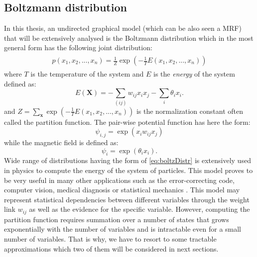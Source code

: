 \documentclass[../report/report.tex]{subfiles}
\begin{document}
\subsection{Boltzmann distribution}
In this thesis, an undirected graphical model (which can be also seen a MRF) that will be extensively analysed is the Boltzmann distribution which in the most general form has the following joint distribution:
\begin{align}
\begin{split}
p(x_1,x_2, ..., x_n) = \frac{1}{Z}\exp \left(-\frac{1}{T}E(x_1,x_2, ..., x_n) \right)
\end{split}
\label{eq:boltzDistr}
\end{align}
where $T$ is the temperature of the system and  $E$ is the \emph{energy} of the system defined as:
$$E(\mathbf{X}) = -\sum_{(ij)} w_{ij} x_i x_j -\sum_i  \theta_i x_i.$$
and $Z = \sum_{\mathbf{x}}\exp (-\frac{1}{T}E(x_1,x_2, ..., x_n))$  is the normalization constant often called the partition function. The pair-wise potential function has here the form:
$$\psi_{i,j} = \exp(x_i w_{ij} x_j)$$
while the magnetic field is defined as:
$$\psi_i = \exp(\theta_i x_i).$$
Wide range of distributions having the form of \ref{eq:boltzDistr} is extensively used in physics to compute the energy of the system of particles. This model proves to be very useful in many other applications such as the error-correcting code, computer vision, medical diagnosis or statistical mechanics \cite{yedidia2001idiosyncratic}. This model may represent statistical dependencies between different variables through the weight link $w_{ij}$ as well as the evidence for the specific variable. However, computing the partition function requires summation over a number of states that grows exponentially with the number of variables and is intractable even for a small number of variables. That is why, we have to resort to some tractable approximations which two of them will be considered in next sections. 
\end{document}
